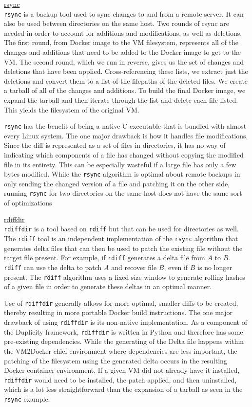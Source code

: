 \underline{rsync}\\
\texttt{rsync} is a backup tool used to sync changes to and from a remote server. It can also be used between directories on the same host. Two rounds of rsync are needed in order to account for additions and modifications, as well as deletions. The first round, from Docker image to the VM filesystem, represents all of the changes and additions that need to be added to the Docker image to get to the VM. The second round, which we run in reverse, gives us the set of changes and deletions that have been applied. Cross-referencing these lists, we extract just the deletions and convert them to a list of the filepaths of the deleted files. We create a tarball of all of the changes and additions. To build the final Docker image, we expand the tarball and then iterate through the list and delete each file listed. This yields the filesystem of the original VM. 

\texttt{rsync} has the benefit of being a native C executable that is bundled with almost  every Linux system. The one major drawback is how it handles file modifications. Since the diff is represented as a set of files in directories, it has no way of indicating which components of a file has changed without copying the modified file in its entirety. This can be especially wasteful if a large file has only a few bytes modified. While the \texttt{rsync} algorithm is optimal about remote backups in only sending the changed version of a file and patching it on the other side, running \texttt{rsync} for two directories on the same host does not have the same sort of optimizations

\underline{rdiffdir}\\
\texttt{rdiffdir} is a tool based on \texttt{rdiff} but that can be used for directories as well. The \texttt{rdiff} tool is an independent implementation of the \texttt{rsync} algorithm that generates delta files that can then be used to patch the existing file without the target file present. For example, if \texttt{rdiff} generates a delta file from $A$ to $B$. \texttt{rdiff} can use the delta to patch $A$ and recover file $B$, even if $B$ is no longer present. The \texttt{rdiff} algorithm uses a fixed size window to generate rolling hashes of a given file in order to generate these deltas in an optimal manner.

Use of \texttt{rdiffdir} generally allows for more optimal, smaller diffs to be created, thereby resulting in more portable Docker build instructions. The one major drawback of using \texttt{rdiffdir} is its non-native implementation. As a component of the Duplicity framework, \texttt{rdiffdir} is written in Python and therefore has some pre-existing dependencies. While the generating of the Delta file happens within the VM2Docker chief environment where dependencies are less important, the patching of the filesystem using the generated delta occurs in the resulting Docker container environment. If a given VM did not already have it installed, \texttt{rdiffdir} would need to be installed, the patch applied, and then uninstalled, which is a lot less straightforward than the expansion of a tarball as seen in the \texttt{rsync} example.


